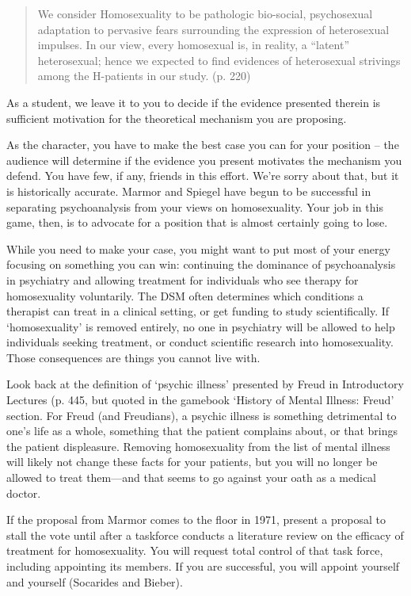 \begin{refsection}
\begin{quote}

We consider Homosexuality to be pathologic bio-social, psychosexual adaptation to pervasive fears surrounding the expression of heterosexual impulses. In our view, every homosexual is, in reality, a “latent” heterosexual; hence we expected to find evidences of heterosexual strivings among the H-patients in our study. (p. 220)
\end{quote}

As a student, we leave it to you to decide if the evidence presented therein is sufficient motivation for the theoretical mechanism you are proposing.

As the character, you have to make the best case you can for your position – the audience will determine if the evidence you present motivates the mechanism you defend. You have few, if any, friends in this effort. We're sorry about that, but it is historically accurate. Marmor and Spiegel have begun to be successful in separating psychoanalysis from your views on homosexuality. Your job in this game, then, is to advocate for a position that is almost certainly going to lose. 

While you need to make your case, you might want to put most of your energy focusing on something you can win: continuing the dominance of psychoanalysis in psychiatry and allowing treatment for individuals who see therapy for homosexuality voluntarily. The DSM often determines which conditions a therapist can treat in a clinical setting, or get funding to study scientifically. If `homosexuality' is removed entirely, no one in psychiatry will be allowed to help individuals seeking treatment, or conduct scientific research into homosexuality. Those consequences are things you cannot live with. 

Look back at the definition of `psychic illness' presented by Freud in Introductory Lectures (p. 445, but quoted in the gamebook `History of Mental Illness: Freud' section. For Freud (and Freudians), a psychic illness is something detrimental to one's life as a whole, something that the patient complains about, or that brings the patient displeasure. Removing homosexuality from the list of mental illness will likely not change these facts for your patients, but you will no longer be allowed to treat them—and that seems to go against your oath as a medical doctor.

If the proposal from Marmor comes to the floor in 1971, present a proposal to stall the vote until after a taskforce conducts a literature review on the efficacy of treatment for homosexuality. You will request total control of that task force, including appointing its members. If you are successful, you will appoint yourself and yourself (Socarides and Bieber). 


\end{refsection}
